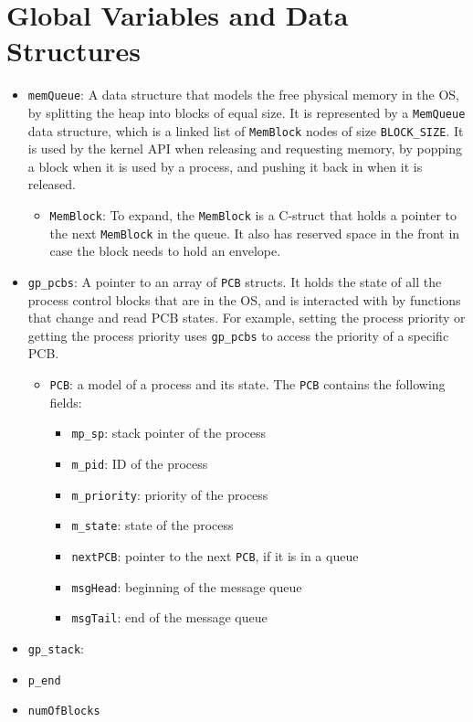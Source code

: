 \documentclass[12pt]{report}
\begin{document}
\section{Global Variables and Data Structures}
\begin{itemize}
  \item \texttt{memQueue}: A data structure that models the free physical memory in the OS, by splitting the heap into blocks of equal size. It is represented by a \texttt{MemQueue} data structure, which is a linked list of \texttt{MemBlock} nodes of size \texttt{BLOCK_SIZE}. It is used by the kernel API when releasing and requesting memory, by popping a block when it is used by a process, and pushing it back in when it is released.
    \begin{itemize}
      \item \texttt{MemBlock}: To expand, the \texttt{MemBlock} is a C-struct that holds a pointer to the next \texttt{MemBlock} in the queue. It also has reserved space in the front in case the block needs to hold an envelope.
    \end{itemize}
  \item \texttt{gp_pcbs}: A pointer to an array of \texttt{PCB} structs. It holds the state of all the process control blocks that are in the OS, and is interacted with by functions that change and read PCB states. For example, setting the process priority or getting the process priority uses \texttt{gp_pcbs} to access the priority of a specific PCB.
    \begin{itemize}
      \item \texttt{PCB}: a model of a process and its state. The \texttt{PCB} contains the following fields:
        \begin{itemize}
          \item \texttt{mp_sp}: stack pointer of the process
          \item \texttt{m_pid}: ID of the process
          \item \texttt{m_priority}: priority of the process
          \item \texttt{m_state}: state of the process
          \item \texttt{nextPCB}: pointer to the next \texttt{PCB}, if it is in a queue
          \item \texttt{msgHead}: beginning of the message queue
          \item \texttt{msgTail}: end of the message queue
        \end{itemize}
    \end{itemize}
  \item \texttt{gp_stack}: 
  \item \texttt{p_end}
  \item \texttt{numOfBlocks}
\end{itemize}
\end{document}
